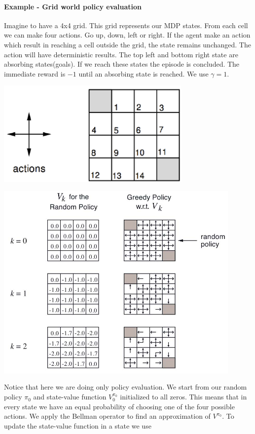 \documentclass[../main.tex]{subfiles}
\begin{document}
\paragraph{Example - Grid world policy evaluation} Imagine to have a 4x4 grid. This grid represents our MDP states. From each cell we can make four actions. Go up, down, left or right. If the agent make an action which result in reaching a cell outside the grid, the state remains unchanged. The action will have deterministic results. The top left and bottom right state are absorbing states(goals). If we reach these states the episode is concluded. The immediate reward is $-1$ until an absorbing state is reached. We use $\gamma = 1$.
\begin{center}
    \includegraphics[width=95mm]{images/Grid_World.PNG}
\end{center}
\begin{center}
    \includegraphics[width=120mm]{images/First-Grid_World.jpg}
\end{center}
Notice that here we are doing only policy evaluation.
We start from our random policy $\pi_0$ and state-value function $V^{\pi_0}_0$ initialized to all zeros. This means that in every state we have an equal probability of choosing one of the four possible actions. We apply the Bellman operator to find an approximation of $V^{\pi_0}$. To update the state-value function in a state we use
\end{document}
